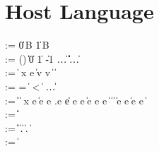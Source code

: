 \section{Host Language}
\label{app:host-lang}

\small
\begin{bnf}
       \::= \cdot \| 0\,B \| 1\,B \\ 
    \::=
      () \| \itrue \| \ifalse \| 0 \| 1 \| -1 \| \dots \nlalt
      \ierr \| \data \| \off \| \iok \| \iecerr \| \iecpc \| \ldots \\

    \::= 
      \const \| %
       {\nrm x} e \| \ipair v v \nlalt
       \|  \|
       \\

    \::= 
      = \; \| \; < \; \| \inotop %
      \| \ldots \\

    \::= 
      \const \| \var \|  \|
       {\nrm x} e \| 
      \iapp e e \nlalt
    \Lambda \alpha.e \| e \; [\ty] \nlalt
       e \; e \|
      \iif e \; \ithen e \; \ielse e \nlalt
       \|  \|
       \|  \nlalt
       \nlalt
       \| \iappend e e \| \isub e {\nrm e} \nlalt
       \| 
      \\
      
    \::= 
      \iunitty \| \iboolty \| \iintty  \| 
      \invty \nlalt  \ibitsty \| \ioffty \| \iecty
  \\
   \meta{\ity} \::= 
      \ibasety \| \ityvar \| \iarrow \ity \ity \| \iprod \ity \ity \|
      \isum \ity \ity \nlalt
      \iseq \ity \| \forall \ityvar.\ity  \|
      \imu \ityvar \ity   
      \| \lambda \alpha.\ity 
      \| \ity \; \ity
  \\
   \meta{\kappa} \::= \kty \| \kappa \rightarrow \kappa
  
\end{bnf}

